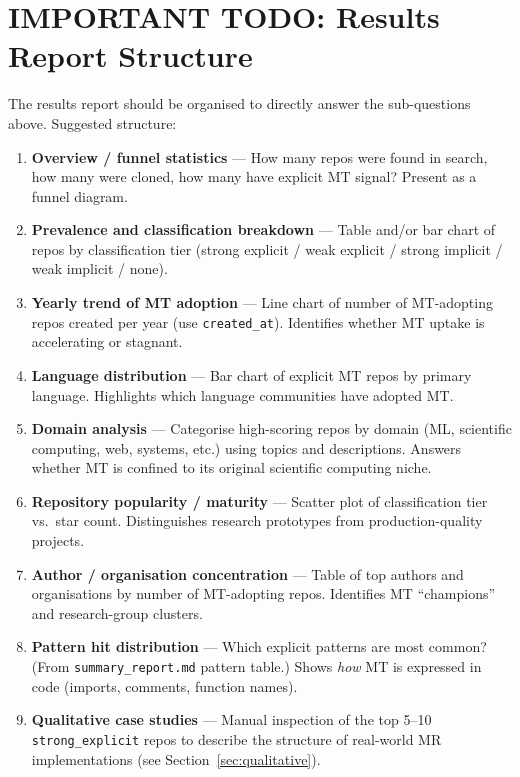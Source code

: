 \documentclass[12pt,a4paper]{article}
\begin{document}
\section{IMPORTANT TODO: Results Report Structure}
\label{sec:results}

The results report should be organised to directly answer the sub-questions
above. Suggested structure:

\begin{enumerate}
  \item \textbf{Overview / funnel statistics} --- How many repos were found in
        search, how many were cloned, how many have explicit MT signal? Present
        as a funnel diagram.

  \item \textbf{Prevalence and classification breakdown} --- Table and/or bar
        chart of repos by classification tier
        (strong explicit / weak explicit / strong implicit / weak implicit / none).

  \item \textbf{Yearly trend of MT adoption} --- Line chart of number of
        MT-adopting repos created per year (use \texttt{created\_at}).
        Identifies whether MT uptake is accelerating or stagnant.

  \item \textbf{Language distribution} --- Bar chart of explicit MT repos by
        primary language. Highlights which language communities have adopted MT.

  \item \textbf{Domain analysis} --- Categorise high-scoring repos by domain
        (ML, scientific computing, web, systems, etc.) using topics and
        descriptions. Answers whether MT is confined to its original scientific
        computing niche.

  \item \textbf{Repository popularity / maturity} --- Scatter plot of
        classification tier vs.\ star count. Distinguishes research prototypes
        from production-quality projects.

  \item \textbf{Author / organisation concentration} --- Table of top authors
        and organisations by number of MT-adopting repos. Identifies MT
        ``champions'' and research-group clusters.

  \item \textbf{Pattern hit distribution} --- Which explicit patterns are most
        common? (From \texttt{summary\_report.md} pattern table.) Shows
        \emph{how} MT is expressed in code (imports, comments, function names).

  \item \textbf{Qualitative case studies} --- Manual inspection of the top
        5--10 \texttt{strong\_explicit} repos to describe the structure of
        real-world MR implementations (see Section~\ref{sec:qualitative}).
\end{enumerate}
\end{document}
